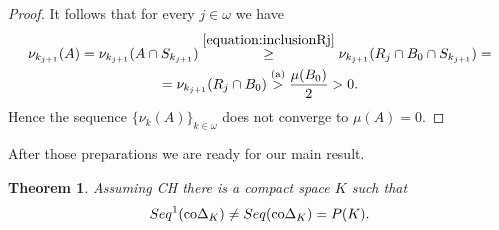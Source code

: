 \documentclass[12pt]{amsart}
\newcommand{\0}{\protect{\bf 0}}
\newcommand{\1}{\protect{\bf 1}}
\newtheorem{theo}{Theorem}[section]
\theoremstyle{definition}
\theoremstyle{remark}
\numberwithin{equation}{section}
\begin{document}
\begin{proof}
It follows that for every $j\in \omega$ we have
\begin{multline*}
	\nu_{k_{j+1}}(A)=
	\nu_{k_{j+1}}(A\cap S_{k_{j+1}})\stackrel{\eqref{equation:inclusionRj}}{\geq}
	\nu_{k_{j+1}}(R_j\cap B_0\cap S_{k_{j+1}})= \\ =
	\nu_{k_{j+1}}(R_j\cap B_0) \stackrel{{\rm (a)}}{>} \frac{\mu(B_0)}{2}>0.
\end{multline*}
Hence the sequence
$\{\nu_k(A)\}_{k\in \omega}$ does not converge to $\mu(A)=0$.
\end{proof}


After those preparations we are ready for our main result.

\begin{theo} \label{ex1:9}
Assuming CH there is a compact space $K$ such that
$$ 
	Seq^1({\rm co}\Delta_K) \neq Seq({\rm co}\Delta_K) = P(K).
$$
\end{theo}
\end{document}
